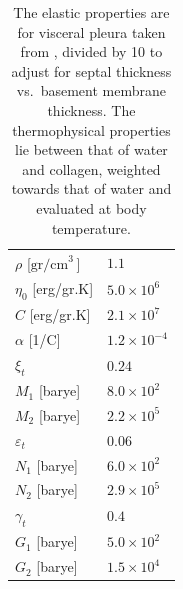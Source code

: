 \begin{table}
    \centering
    \begin{tabular}{|l|l|}
        \hline
        $\rho$ \hfill [$\textrm{gr/cm}^{3^{\phantom{|}}}$] & $1.1$ \\
        $\eta_0$ \hfill [erg/gr.K] & $5.0 \times 10^6$ \\
        $C$ \hfill [erg/gr.K] & $2.1 \times 10^7$ \\
        $\alpha$ \hfill [1/C] & $1.2 \times 10^{-4}$ \\
        $\xi_t$ & $0.24$ \\
        $M_1$ \hfill [barye] & $8.0 \times 10^2$ \\
        $M_2$ \hfill [barye] & $2.2 \times 10^5$ \\ 
        $\varepsilon_t$ & $0.06$ \\
        $N_1$ \hfill [barye] & $6.0 \times 10^2$ \\
        $N_2$ \hfill [barye] & $2.9 \times 10^5$ \\ 
        $\gamma_t$ & $0.4$ \\
        $G_1$ \hfill [barye] & $5.0 \times 10^2$ \\
        $G_2$ \hfill [barye] & $1.5 \times 10^4$ \\ \hline
    \end{tabular}
    \caption{The elastic properties are for visceral pleura taken from \cite{Freedetal17}, divided by 10 to adjust for septal thickness vs.\ basement membrane thickness.  The thermo\-physical properties lie between that of water and collagen, weighted towards that of water and evaluated at body temperature.}
    \label{tableVisceralPleura}
\end{table}

